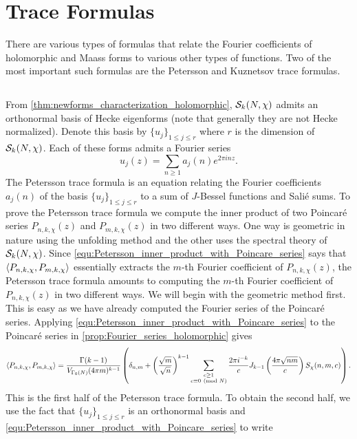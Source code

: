 \chapter{Trace Formulas}
  There are various types of formulas that relate the Fourier coefficients of holomorphic and Maass forms to various other types of functions. Two of the most important such formulas are the Petersson and Kuznetsov trace formulas.
  \section{}
    From \cref{thm:newforms_characterization_holomorphic}, $\mathcal{S}_{k}(N,\chi)$ admits an orthonormal basis of Hecke eigenforms (note that generally they are not Hecke normalized). Denote this basis by $\{u_{j}\}_{1 \le j \le r}$ where $r$ is the dimension of $\mathcal{S}_{k}(N,\chi)$. Each of these forms admits a Fourier series
    \[
      u_{j}(z) = \sum_{n \ge 1}a_{j}(n)e^{2\pi inz}.
    \]
    The Petersson trace formula is an equation relating the Fourier coefficients $a_{j}(n)$ of the basis $\{u_{j}\}_{1 \le j \le r}$ to a sum of $J$-Bessel functions and Sali\'e sums. To prove the Petersson trace formula we compute the inner product of two Poincar\'e series $P_{n,k,\chi}(z)$ and $P_{m,k,\chi}(z)$ in two different ways. One way is geometric in nature using the unfolding method and the other uses the spectral theory of $\mathcal{S}_{k}(N,\chi)$. Since \cref{equ:Petersson_inner_product_with_Poincare_series} says that $\langle P_{n,k,\chi},P_{m,k,\chi}\rangle$ essentially extracts the $m$-th Fourier coefficient of $P_{n,k,\chi}(z)$, the Petersson trace formula amounts to computing the $m$-th Fourier coefficient of $P_{n,k,\chi}(z)$ in two different ways. We will begin with the geometric method first. This is easy as we have already computed the Fourier series of the Poincar\'e series. Applying \cref{equ:Petersson_inner_product_with_Poincare_series} to the Poincar\'e series in \cref{prop:Fourier_series_holomorphic} gives
    \[
      \langle P_{n,k,\chi},P_{m,k,\chi}\rangle = \frac{\Gamma(k-1)}{V_{\Gamma_{0}(N)}(4\pi m)^{k-1}}\left(\delta_{n,m}+\left(\frac{\sqrt{m}}{\sqrt{n}}\right)^{k-1}\sum_{\substack{c \ge 1 \\ c \equiv 0 \ \left(\text{mod }N\right)}}\frac{2\pi i^{-k}}{c}J_{k-1}\left(\frac{4\pi\sqrt{nm}}{c}\right)S_{\chi}(n,m,c)\right).
    \]
    This is the first half of the Petersson trace formula. To obtain the second half, we use the fact that $\{u_{j}\}_{1 \le j \le r}$ is an orthonormal basis and \cref{equ:Petersson_inner_product_with_Poincare_series} to write
